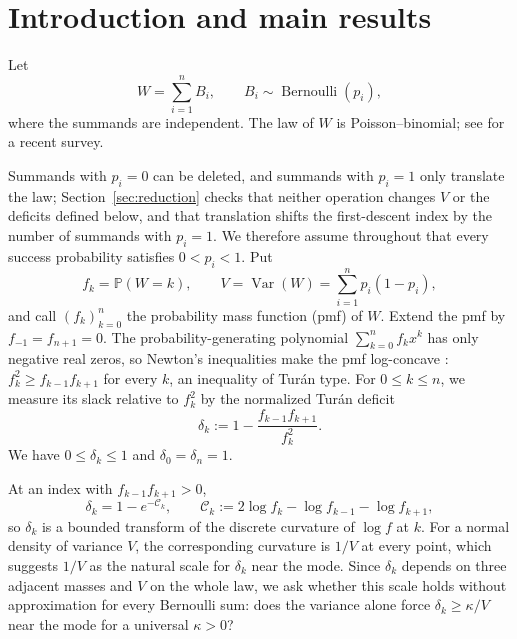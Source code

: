 \documentclass[ECP,preprint]{ejpecp}
\newcommand{\Pp}{\mathbb{P}}
\newcommand{\Var}{\operatorname{Var}}
\newcommand{\Ber}{\operatorname{Bernoulli}}
\begin{document}
\section{Introduction and main results}\label{sec:introduction}

Let
\[
  W=\sum_{i=1}^n B_i,
  \qquad B_i\sim\Ber(p_i),
\]
where the summands are independent. The law of $W$ is Poisson--binomial;
see \cite{tangtang2023} for a recent survey.

Summands with $p_i=0$ can be deleted, and summands with $p_i=1$ only
translate the law; Section~\ref{sec:reduction} checks that neither operation
changes $V$ or the deficits defined below, and that translation shifts the
first-descent index by the number of summands with $p_i=1$. We therefore assume throughout that
every success probability satisfies $0<p_i<1$. Put
\[
  f_k=\Pp(W=k),\qquad V=\Var(W)=\sum_{i=1}^n p_i(1-p_i),
\]
and call $(f_k)_{k=0}^n$ the probability mass function (pmf) of $W$. Extend
the pmf by $f_{-1}=f_{n+1}=0$. The probability-generating polynomial
$\sum_{k=0}^n f_kx^k$ has only negative real zeros, so Newton's inequalities
make the pmf log-concave \cite[equation~(1)]{pitman1997}: $f_k^2\geq
f_{k-1}f_{k+1}$ for every $k$, an inequality of Tur\'an type. For
$0\leq k\leq n$, we measure its slack relative to $f_k^2$ by the normalized
Tur\'an deficit
\begin{equation}\label{eq:deficit}
  \delta_k
  :=1-\frac{f_{k-1}f_{k+1}}{f_k^2}.
\end{equation}
We have $0\leq\delta_k\leq1$ and $\delta_0=\delta_n=1$.

At an index with
$f_{k-1}f_{k+1}>0$,
\[
  \delta_k=1-e^{-\mathcal C_k},
  \qquad
  \mathcal C_k:=2\log f_k-\log f_{k-1}-\log f_{k+1},
\]
so $\delta_k$ is a bounded transform of the discrete curvature of $\log f$
at $k$. For a normal density of variance $V$, the corresponding curvature is
$1/V$ at every point, which suggests $1/V$ as the natural scale for
$\delta_k$ near the mode. Since $\delta_k$ depends on three adjacent masses
and $V$ on the whole law, we ask whether this scale holds without
approximation for every Bernoulli sum: does the variance alone force
$\delta_k\geq\kappa/V$ near the mode for a universal $\kappa>0$?
\end{document}
